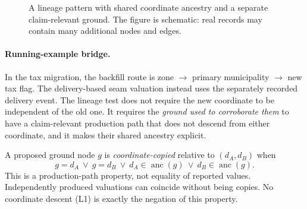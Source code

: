 \documentclass[smallextended,envcountsect,envcountsame,natbib]{svjour3}
\begin{document}
\begin{figure}[htbp]
\centering
{}
\caption{A lineage pattern with shared coordinate ancestry and a separate claim-relevant ground. The figure is schematic: real records may contain many additional nodes and edges.}
\label{ex:fig:lineage-dag}
\end{figure}

\paragraph{Running-example bridge.} In the tax migration, the backfill route is zone $\to$ primary municipality $\to$ new tax flag. The delivery-based seam valuation instead uses the separately recorded delivery event. The lineage test does not require the new coordinate to be independent of the old one. It requires the \emph{ground used to corroborate them} to have a claim-relevant production path that does not descend from either coordinate, and it makes their shared ancestry explicit.

\begin{definition}\label{ex:def:copied-ground}
A proposed ground node $g$ is \emph{coordinate-copied} relative to $(d_A,d_B)$ when
\[
g=d_A\ \lor\ g=d_B\ \lor\ d_A\in\operatorname{anc}(g)\ \lor\ d_B\in\operatorname{anc}(g).
\]
This is a production-path property, not equality of reported values. Independently produced valuations can coincide without being copies. No coordinate descent (L1) is exactly the negation of this property.
\end{definition}
\end{document}
